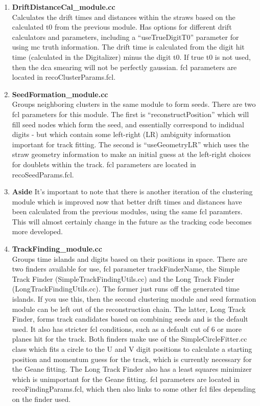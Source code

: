\begin{enumerate}
          \item{\bf{DriftDistanceCal\_module.cc}} \\
          Calculates the drift times and distances within the straws based on the calculated t0 from the previous module. Has options for different drift calculators and parameters, including a ``useTrueDigitT0'' parameter for using mc truth information. The drift time is calculated from the digit hit time (calculated in the Digitalizer) minus the digit t0. If true t0 is not used, then the dca smearing will not be perfectly gaussian. fcl parameters are located in recoClusterParams.fcl.

          \item{\bf{SeedFormation\_module.cc}} \\
          Groups neighboring clusters in the same module to form seeds. There are two fcl parameters for this module. The first is ``reconstructPosition'' which will fill seed nodes which form the seed, and essentially correspond to indidual digits - but which contain some left-right (LR) ambiguity information important for track fitting. The second is ``useGeometryLR'' which uses the straw geometry information to make an initial guess at the left-right choices for doublets within the track. fcl parameters are located in recoSeedParams.fcl.

          \item{\bf{Aside}}
          It's important to note that there is another iteration of the clustering module which is improved now that better drift times and distances have been calculated from the previous modules, using the same fcl paramters. This will almost certainly change in the future as the tracking code becomes more developed.

          \item{\bf{TrackFinding\_module.cc}} \\
          Groups time islands and digits based on their positions in space. There are two finders available for use, fcl parameter trackFinderName, the Simple Track Finder (SimpleTrackFindingUtils.cc) and the Long Track Finder (LongTrackFindingUtils.cc). The former just runs off the generated time islands. If you use this, then the second clustering module and seed formation module can be left out of the reconstruction chain. The latter, Long Track Finder, forms track candidates based on combining seeds and is the default used. It also has stricter fcl conditions, such as a default cut of 6 or more planes hit for the track. Both finders make use of the SimpleCircleFitter.cc class which fits a circle to the U and V digit positions to calculate a starting position and momentum guess for the track, which is currently necessary for the Geane fitting. The Long Track Finder also has a least squares minimizer which is unimportant for the Geane fitting. fcl parameters are located in recoFindingParams.fcl, which then also links to some other fcl files depending on the finder used.


    \end{enumerate}

